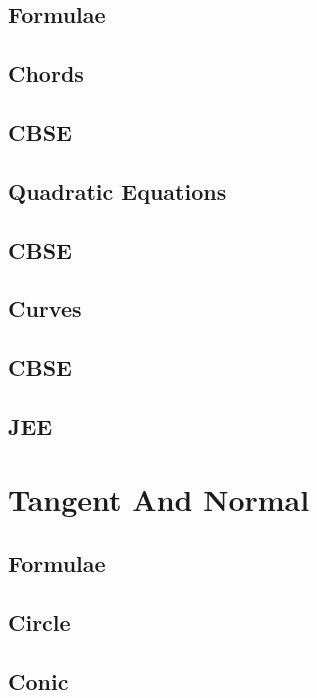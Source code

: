 \documentclass[journal]{IEEEtran}
\begin{document}
\subsection{Formulae}

\subsection{Chords}

\subsection{CBSE}

\subsection{Quadratic Equations}

\subsection{CBSE}

\subsection{Curves}

\subsection{CBSE}

\subsection{JEE}
 

\newpage
\section{Tangent And Normal}
\subsection{Formulae}

\subsection{Circle}

\subsection{Conic}

\end{document}
